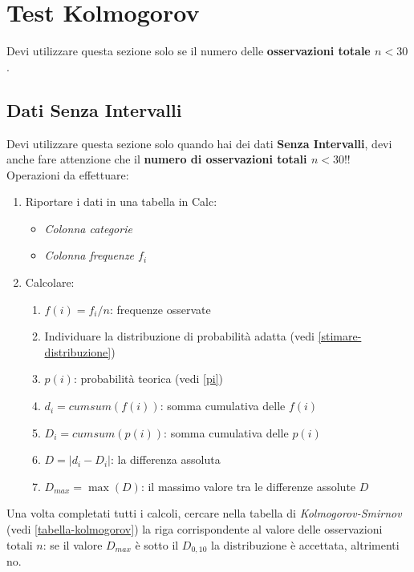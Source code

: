 \section{Test Kolmogorov}

Devi utilizzare questa sezione solo se il numero delle \textbf{osservazioni
      totale $n < 30$}.

\subsection{Dati Senza Intervalli}

Devi utilizzare questa sezione solo quando hai dei dati \textbf{Senza
      Intervalli}, devi anche fare attenzione che il \textbf{numero di
      osservazioni totali $n < 30$}!!\\

Operazioni da effettuare:

\begin{enumerate}
      \item Riportare i dati in una tabella in Calc:
            \begin{itemize}
                  \item \textit{Colonna categorie}
                  \item \textit{Colonna frequenze $f_i$}
            \end{itemize}
      \item Calcolare:
            \begin{enumerate}
                  \item $f(i) = f_i / n$: frequenze osservate
                  \item Individuare la distribuzione di probabilità adatta (vedi
                        \ref{stimare-distribuzione})
                  \item $p(i)$: probabilità teorica (vedi \ref{pi})
                  \item $d_i = cumsum(f(i))$: somma cumulativa delle $f(i)$
                  \item $D_i = cumsum(p(i))$: somma cumulativa delle $p(i)$
                  \item $D = |d_i - D_i|$: la differenza assoluta
                  \item $D_{max} = \max(D)$: il massimo valore tra le differenze
                        assolute $D$
            \end{enumerate}
\end{enumerate}

Una volta completati tutti i calcoli, cercare nella tabella di
\textit{Kolmogorov-Smirnov} (vedi \ref{tabella-kolmogorov}) la riga corrispondente al valore delle osservazioni
totali $n$: se il valore $D_{max}$ è sotto il $D_{0,10}$ la distribuzione è
accettata, altrimenti no.

